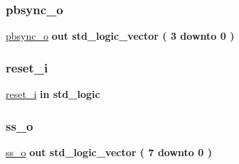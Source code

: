 \mbox{\label{classio__ctrl_a95d4164acb4876609c3ee30095deba32}} 
\subsubsection{\texorpdfstring{pbsync\+\_\+o}{pbsync\_o}}
{\footnotesize\ttfamily \hyperlink{classio__ctrl_a95d4164acb4876609c3ee30095deba32}{pbsync\+\_\+o} {\bfseries \textcolor{keywordflow}{out}\textcolor{vhdlchar}{ }} {\bfseries \textcolor{comment}{std\+\_\+logic\+\_\+vector}\textcolor{vhdlchar}{ }\textcolor{vhdlchar}{(}\textcolor{vhdlchar}{ }\textcolor{vhdlchar}{ } \textcolor{vhdldigit}{3} \textcolor{vhdlchar}{ }\textcolor{keywordflow}{downto}\textcolor{vhdlchar}{ }\textcolor{vhdlchar}{ } \textcolor{vhdldigit}{0} \textcolor{vhdlchar}{ }\textcolor{vhdlchar}{)}\textcolor{vhdlchar}{ }} \hspace{0.3cm}{\ttfamily [Port]}}

\mbox{\label{classio__ctrl_a55da7e76960757f8c6842e86a28ee7be}} 
\subsubsection{\texorpdfstring{reset\+\_\+i}{reset\_i}}
{\footnotesize\ttfamily \hyperlink{classio__ctrl_a55da7e76960757f8c6842e86a28ee7be}{reset\+\_\+i} {\bfseries \textcolor{keywordflow}{in}\textcolor{vhdlchar}{ }} {\bfseries \textcolor{comment}{std\+\_\+logic}\textcolor{vhdlchar}{ }} \hspace{0.3cm}{\ttfamily [Port]}}

\mbox{\label{classio__ctrl_a818bce4de706b73d1b0168e689b5301b}} 
\subsubsection{\texorpdfstring{ss\+\_\+o}{ss\_o}}
{\footnotesize\ttfamily \hyperlink{classio__ctrl_a818bce4de706b73d1b0168e689b5301b}{ss\+\_\+o} {\bfseries \textcolor{keywordflow}{out}\textcolor{vhdlchar}{ }} {\bfseries \textcolor{comment}{std\+\_\+logic\+\_\+vector}\textcolor{vhdlchar}{ }\textcolor{vhdlchar}{(}\textcolor{vhdlchar}{ }\textcolor{vhdlchar}{ } \textcolor{vhdldigit}{7} \textcolor{vhdlchar}{ }\textcolor{keywordflow}{downto}\textcolor{vhdlchar}{ }\textcolor{vhdlchar}{ } \textcolor{vhdldigit}{0} \textcolor{vhdlchar}{ }\textcolor{vhdlchar}{)}\textcolor{vhdlchar}{ }} \hspace{0.3cm}{\ttfamily [Port]}}

